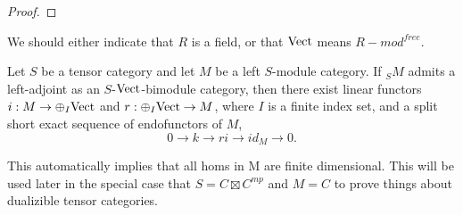 \documentclass{amsart}
\begin{document}
\begin{proof}
\end{proof}


{\color{CDcolor} We should either indicate that $R$ is a field, or that $\mathrm{Vect}$ means $R-mod^{free}$.}

\begin{proposition}
	Let $S$ be a tensor category and let $M$ be a left $S$-module category.  If ${}_S M$ admits a left-adjoint as an $S$-$\mathrm{Vect}$-bimodule category, then there exist linear functors  $i: M \to \oplus_I \mathrm{Vect}$ and $r: \oplus_I \mathrm{Vect} \to M$, where $I$ is a finite index set, and  a split short exact sequence of endofunctors of $M$,
	\begin{equation*}
		0 \to k \to ri \to id_M \to 0.
	\end{equation*}
	

	
\end{proposition}

{\color{CSPcolor} This automatically implies that all homs in M are finite dimensional. 
This will be used later in the special case that $S = C \boxtimes C^{mp}$ and $M=C$ to prove things about  dualizible tensor categories.}
\end{document}
